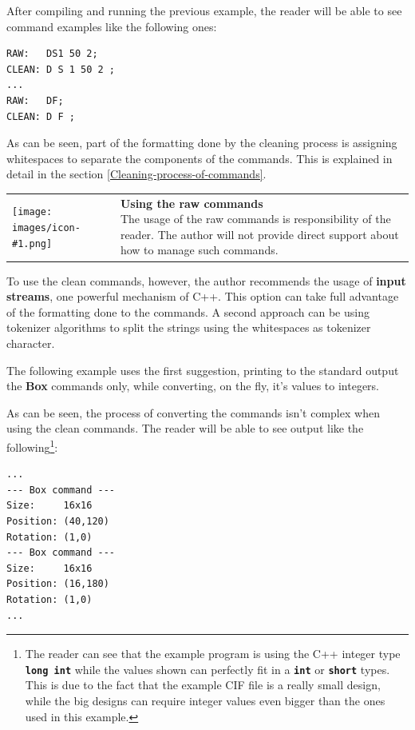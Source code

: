 \documentclass[11pt,twoside,openany,x11names,svgnames]{memoir}
\makeatletter
\newcommand{\IconNote}[3]
{
	\begin{table}[ht]
	\begin{tabular}{ lm{\dimexpr\textwidth-8\tabcolsep-\wd0}@{}}
		\toprule
		\texttt{[image: images/icon-\#1.png]}
		&
		\parbox[t]{155mm}{
		\textbf{#2} \\
		#3
		}
	\end{tabular}
\end{table}
}
\makeatother
\begin{document}


After compiling and running the previous example, the reader will be able to see command examples like the following ones:

\begin{lstlisting}[frame=single,style=CPPStyle]
RAW:   DS1 50 2;
CLEAN: D S 1 50 2 ;
...
RAW:   DF;
CLEAN: D F ;
\end{lstlisting}

As can be seen, part of the formatting done by the cleaning process is assigning whitespaces to separate the components of the commands. This is explained in detail in the section \ref{Cleaning-process-of-commands}.

\IconNote
	{warning}
	{Using the raw commands}
	{The usage of the raw commands is responsibility of the reader. The author will not provide direct support about how to manage such commands.}

To use the clean commands, however, the author recommends the usage of \textbf{input streams}, one powerful mechanism of C++. This option can take full advantage of the formatting done to the commands. A second approach can be using tokenizer algorithms to split the strings using the whitespaces as tokenizer character.

The following example uses the first suggestion, printing to the standard output the \textbf{Box} commands only, while converting, on the fly, it's values to integers.



As can be seen, the process of converting the commands isn't complex when using the clean commands. The reader will be able to see output like the following\footnote{The reader can see that the example program is using the C++ integer type \textbf{\texttt{long int}} while the values shown can perfectly fit in a \textbf{\texttt{int}} or \textbf{\texttt{short}} types. This is due to the fact that the example CIF file is a really small design, while the big designs can require integer values even bigger than the ones used in this example.}:

\begin{lstlisting}[frame=single,style=CPPStyle]
...
--- Box command ---
Size:     16x16
Position: (40,120)
Rotation: (1,0)
--- Box command ---
Size:     16x16
Position: (16,180)
Rotation: (1,0)
...
\end{lstlisting}
\end{document}
